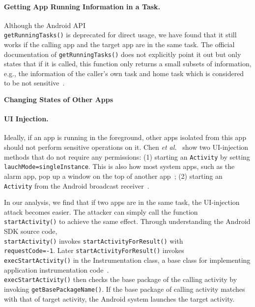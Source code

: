 \documentclass[letterpaper,12pt]{article}
\begin{document}
\paragraph*{Getting App Running Information in a Task.}
Although the Android API \\
\texttt{getRunningTasks()} is deprecated for
direct usage, we have found that it still works if the calling app and
the target app are in the same task.  The official documentation of
\texttt{getRunningTasks()} does not explicitly point it out but only
states that if it is called, this function only returns a small
subsets of information, e.g., the information of the caller's own task
and home task which is considered to be not
sensitive~\cite{getrunningtask}.


\textbf{Changing States of Other Apps}

\noindent

\paragraph*{UI Injection.}
Ideally, if an app is running in the foreground, other apps isolated
from this app should not perform sensitive operations on it. Chen {\em et
al.}~\cite{UIstateinference} show two UI-injection methods that do not
require any permissions: (1) starting an \texttt{Activity} by setting
\texttt{lauchMode=singleInstance}. This is also how most system apps,
such as the alarm app, pop up a window on the top of another
app~\cite{androidlaunchmode}; (2) starting an \texttt{Activity} from
the Android broadcast receiver~\cite{androidbroadcastreceiver}.

In our analysis, we find that if two apps are in the same task, the
UI-injection attack becomes easier.  The attacker can simply call the
function \texttt{startActivity()} to achieve the same effect. Through
understanding the Android SDK source code,\\
 \texttt{startActivity()}
invokes \texttt{startActivityForResult()} with\\
\texttt{requestCode=-1}. Later 
\texttt{startActivityForResult()}
invokes\\
 \texttt{execStartActivity()} in the Instrumentation class, a
base class for implementing application instrumentation
code~\cite{Instrumentation}. \\
 \texttt{execStartActivity()} then checks
the base package of the calling activity by invoking
\texttt{getBasePackageName()}. If the base package of calling activity
matches with that of target activity, the Android system launches the
target activity.
\end{document}
